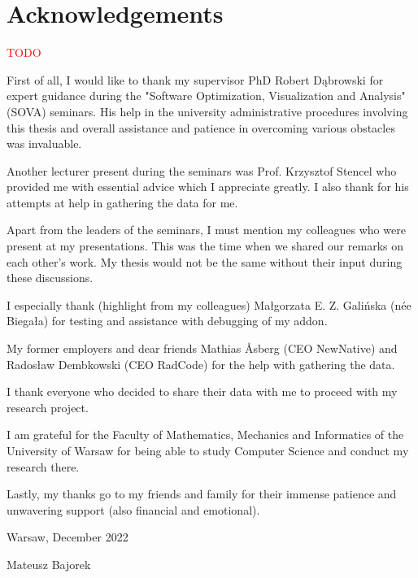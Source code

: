 \chapter*{Acknowledgements}
\textcolor{red}{TODO}

First of all, I would like to thank my supervisor PhD Robert Dąbrowski for expert guidance during the "Software Optimization, Visualization and Analysis" (SOVA) seminars. His help in the university administrative procedures involving this thesis and overall assistance and patience in overcoming various obstacles was invaluable. 

Another lecturer present during the seminars was Prof. Krzysztof Stencel who provided me with essential advice which I appreciate greatly. I also thank for his attempts at help in gathering the data for me.

Apart from the leaders of the seminars, I must mention my colleagues who were present at my presentations. This was the time when we shared our remarks on each other's work. My thesis would not be the same without their input during these discussions.

I especially thank (highlight from my colleagues) Małgorzata E. Z. Galińska (née Biegała) for testing and assistance with debugging of my addon.

My former employers and dear friends Mathias Åsberg (CEO NewNative) and Radosław Dembkowski (CEO RadCode) for the help with gathering the data.

I thank everyone who decided to share their data with me to proceed with my research project.

I am grateful for the Faculty of Mathematics, Mechanics and Informatics of the University of Warsaw for being able to study Computer Science and conduct my research there.

Lastly, my thanks go to my friends and family for their immense patience and unwavering support (also financial and emotional).

\begin{flushright}
Warsaw, December 2022

Mateusz Bajorek
\end{flushright}

